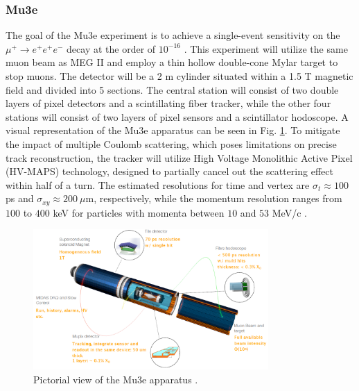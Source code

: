 \begin{refsection}
        \subsubsection{Mu3e}
        The goal of the Mu3e experiment is to achieve a single-event sensitivity on the $\mu^+ \rightarrow e^+ e^+e^-$ decay at the order of $10^{-16}$ \cite{Mu3e:2016}. 
        This experiment will utilize the same muon beam as MEG II and employ a thin hollow double-cone Mylar target to stop muons. 
        The detector will be a 2 m cylinder situated within a 1.5 T magnetic field and divided into 5 sections. 
        The central station will consist of two double layers of pixel detectors and a scintillating fiber tracker, while the other four stations will consist of two layers of pixel sensors and a scintillator hodoscope.
        A visual representation of the Mu3e apparatus can be seen in Fig. \ref{_Mu3e_3D}. 
        To mitigate the impact of multiple Coulomb scattering, which poses limitations on precise track reconstruction, the tracker will utilize High Voltage Monolithic Active Pixel (HV-MAPS) technology, designed to partially cancel out the scattering effect within half of a turn. 
        The estimated resolutions for time and vertex are $\sigma_t \approx 100$ ps and $\sigma_{xy} \approx 200\ \mu$m, respectively, while the momentum resolution ranges from $100$ to $400$ keV for particles with momenta between $10$ and $53$ MeV/c \cite{Signorelli}. 
        
        \begin{figure}[h!]
            \centering
            \includegraphics[width=0.8\textwidth]{Figures/Introduction/Mu3e_3D.png}
            \caption[cLFV: Mu3e experiment]{Pictorial view of the Mu3e apparatus \cite{Papa}.}
        \label{_Mu3e_3D}
        \end{figure}


\end{refsection}
